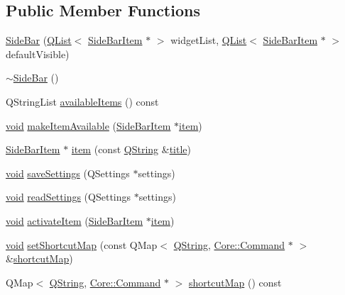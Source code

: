 \subsection*{Public Member Functions}
\begin{DoxyCompactItemize}
\item 
\hyperlink{group___core_plugin_ga5adaad252590a5f4b85707a02e701fd7}{Side\-Bar} (\hyperlink{class_q_list}{Q\-List}$<$ \hyperlink{class_core_1_1_side_bar_item}{Side\-Bar\-Item} $\ast$ $>$ widget\-List, \hyperlink{class_q_list}{Q\-List}$<$ \hyperlink{class_core_1_1_side_bar_item}{Side\-Bar\-Item} $\ast$ $>$ default\-Visible)
\item 
\hyperlink{group___core_plugin_gab6585fb18d33836f7210a804eb9fcfa0}{$\sim$\-Side\-Bar} ()
\item 
Q\-String\-List \hyperlink{group___core_plugin_ga8d31c5b7f76965aee0c0d6aa3cf394eb}{available\-Items} () const 
\item 
\hyperlink{group___u_a_v_objects_plugin_ga444cf2ff3f0ecbe028adce838d373f5c}{void} \hyperlink{group___core_plugin_gaf14b524c0aa8e6f0f088891fab7eda6d}{make\-Item\-Available} (\hyperlink{class_core_1_1_side_bar_item}{Side\-Bar\-Item} $\ast$\hyperlink{group___core_plugin_ga1b2a8f4f2070f02f3953f6f60b916b4a}{item})
\item 
\hyperlink{class_core_1_1_side_bar_item}{Side\-Bar\-Item} $\ast$ \hyperlink{group___core_plugin_ga1b2a8f4f2070f02f3953f6f60b916b4a}{item} (const \hyperlink{group___u_a_v_objects_plugin_gab9d252f49c333c94a72f97ce3105a32d}{Q\-String} \&\hyperlink{_parse_e_k_f_log_8m_a5df555a5fed35967e041e4abd1269b4e}{title})
\item 
\hyperlink{group___u_a_v_objects_plugin_ga444cf2ff3f0ecbe028adce838d373f5c}{void} \hyperlink{group___core_plugin_ga045aee7585eaa788498f20c7c657ddce}{save\-Settings} (Q\-Settings $\ast$settings)
\item 
\hyperlink{group___u_a_v_objects_plugin_ga444cf2ff3f0ecbe028adce838d373f5c}{void} \hyperlink{group___core_plugin_gae90b1ee5b104fdf636e303f8c4d082a6}{read\-Settings} (Q\-Settings $\ast$settings)
\item 
\hyperlink{group___u_a_v_objects_plugin_ga444cf2ff3f0ecbe028adce838d373f5c}{void} \hyperlink{group___core_plugin_gae360c581c9fa539290c399ffa83abed8}{activate\-Item} (\hyperlink{class_core_1_1_side_bar_item}{Side\-Bar\-Item} $\ast$\hyperlink{group___core_plugin_ga1b2a8f4f2070f02f3953f6f60b916b4a}{item})
\item 
\hyperlink{group___u_a_v_objects_plugin_ga444cf2ff3f0ecbe028adce838d373f5c}{void} \hyperlink{group___core_plugin_gad5d0677532b9df5a908a86e8f593e861}{set\-Shortcut\-Map} (const Q\-Map$<$ \hyperlink{group___u_a_v_objects_plugin_gab9d252f49c333c94a72f97ce3105a32d}{Q\-String}, \hyperlink{class_core_1_1_command}{Core\-::\-Command} $\ast$ $>$ \&\hyperlink{group___core_plugin_gafbb7546d9c9f5d420ebda5571d659b88}{shortcut\-Map})
\item 
Q\-Map$<$ \hyperlink{group___u_a_v_objects_plugin_gab9d252f49c333c94a72f97ce3105a32d}{Q\-String}, \hyperlink{class_core_1_1_command}{Core\-::\-Command} $\ast$ $>$ \hyperlink{group___core_plugin_gafbb7546d9c9f5d420ebda5571d659b88}{shortcut\-Map} () const 
\end{DoxyCompactItemize}
